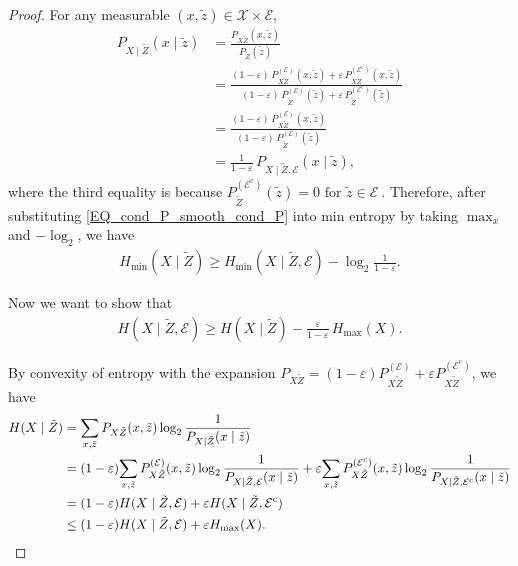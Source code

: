 \documentclass[onecolumn]{IEEEtran} %
\newcommand{\1}{\mathbbm{1}}
\theoremstyle{boldremark}
\begin{document}
\begin{proof}
For any measurable $(x, \tilde{z})\in\mathcal X\times\mathcal E$,
\begin{align}
P_{X\mid  \tilde{Z}}(x\mid  \tilde{z})
   &=\frac{P_{X \tilde{Z}}(x, \tilde{z})}{P_{\tilde{Z}}( \tilde{z})}
     \\
   &=\frac{(1-\varepsilon)\,P_{X \tilde{Z}}^{(\mathcal E)}(x, \tilde{z})
            +\varepsilon\,P_{X \tilde{Z}}^{(\mathcal E^{\mathrm c})}(x, \tilde{z})}
           {(1-\varepsilon)\,P_{ \tilde{Z}}^{(\mathcal E)}( \tilde{z})
            +\varepsilon\,P_{ \tilde{Z}}^{(\mathcal E^{\mathrm c})}( \tilde{z})}  \\
   &=\frac{(1-\varepsilon)\,P_{X \tilde{Z}}^{(\mathcal E)}(x, \tilde{z})}
           {(1-\varepsilon)\,P_{ \tilde{Z}}^{(\mathcal E)}( \tilde{z})}\\
   &=\frac{1}{1-\varepsilon}\,P_{X\mid  \tilde{Z},\mathcal E}(x\mid  \tilde{z}),\label{EQ_cond_P_smooth_cond_P}
\end{align}
where the third equality is because $P_{ \tilde{Z}}^{(\mathcal E^{\mathrm c})}( \tilde{z})=0\text{ for } \tilde{z}\in\mathcal E\ $. Therefore, after substituting \eqref{EQ_cond_P_smooth_cond_P} into min entropy by taking \(\max_x\) and \(-\log_2\), we have
\begin{align}
   H_{\min}(X\mid  \tilde{Z})
   \ge H_{\min}(X\mid  \tilde{Z},\mathcal E)-\log_2\!\frac1{1-\varepsilon}. \label{EQ_Hmin_Hmin}
\end{align}
   


Now we want to show that
\begin{align}
  H(X\mid  \tilde{Z},\mathcal E)
  \ge H(X\mid  \tilde{Z})-\frac{\varepsilon}{1-\varepsilon}\,H_{\max}(X).  
\end{align}
  
By convexity of entropy with the expansion \(P_{X \tilde{Z}}=(1-\varepsilon)P^{(\mathcal E)}_{X \tilde{Z}}
          +\varepsilon P^{(\mathcal E^{\mathrm c})}_{X \tilde{Z}}\), we have 
\begin{align}
H(X\mid  \tilde{Z})
&=\sum_{x, \tilde{z}}P_{X \tilde{Z}}(x, \tilde{z})
        \log_2\frac{1}{P_{X\mid  \tilde{Z}}(x\mid  \tilde{z})}                     \notag\\
   &=(1-\varepsilon)\!
        \sum_{x, \tilde{z}}P_{X \tilde{Z}}^{(\mathcal E)}(x, \tilde{z})
        \log_2\frac{1}{P_{X\mid  \tilde{Z},\mathcal E}(x\mid  \tilde{z})} +\varepsilon\!
        \sum_{x, \tilde{z}}P_{X \tilde{Z}}^{(\mathcal E^{\mathrm c})}(x, \tilde{z})
        \log_2\frac{1}{P_{X\mid  \tilde{Z},\mathcal E^{\mathrm c}}(x\mid  \tilde{z})}\notag\\
   &= (1-\varepsilon)H(X\mid  \tilde{Z},\mathcal E)
   +\varepsilon H(X\mid  \tilde{Z},\mathcal E^{\mathrm c})\\
&\le (1-\varepsilon)H(X\mid  \tilde{Z},\mathcal E)
    +\varepsilon H_{\max}(X).
\end{align}


\end{proof}
\end{document}
